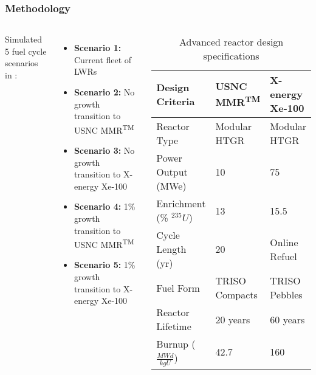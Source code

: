 \begin{frame}
    \frametitle{Methodology}
    \begin{columns}
        \column[t]{4.5cm}
        Simulated 5 fuel cycle scenarios in \Cyclus \cite{huff_fundamental_2016}:
    \begin{itemize}
        \item \textbf{Scenario 1:} Current fleet of \glspl{LWR}
        \item \textbf{Scenario 2:} No growth transition to \gls{USNC} \gls{MMR}\textsuperscript{TM}
        \item \textbf{Scenario 3:} No growth transition to X-energy Xe-100
        \item \textbf{Scenario 4:} 1\% growth transition to \gls{USNC} \gls{MMR}\textsuperscript{TM}
        \item \textbf{Scenario 5:} 1\% growth transition to X-energy Xe-100
    \end{itemize}

    \column[t]{5.5cm}
    \begingroup
        \renewcommand{\arraystretch}{1.3} %
        \vspace{-0.8cm}
        \begin{table}[t!]
            \small
            \caption{Advanced reactor design specifications}
            \label{tab:reactor_summary}
            \begin{tabular}{ p{1.5cm} p{1.5cm} p{1.25cm}}
                \hline
                Design Criteria & \gls{USNC} \gls{MMR}\textsuperscript{TM} & 
                    X-energy Xe-100 \\\hline
                Reactor Type & Modular HTGR & Modular HTGR \\
                Power Output (MWe) & 10 & 75 \\
                Enrichment (\% $^{235}U$) & 13 & 15.5 \\
                Cycle Length (yr) & 20 & Online Refuel\\
                Fuel Form & TRISO Compacts & TRISO Pebbles\\
                Reactor Lifetime & 20 years & 60 years \\
                Burnup ($\frac{MWd}{kg U}$) & 42.7 & 160 \\
                \hline
            \end{tabular}
        \end{table}   
        \endgroup
    \end{columns}
\end{frame}

